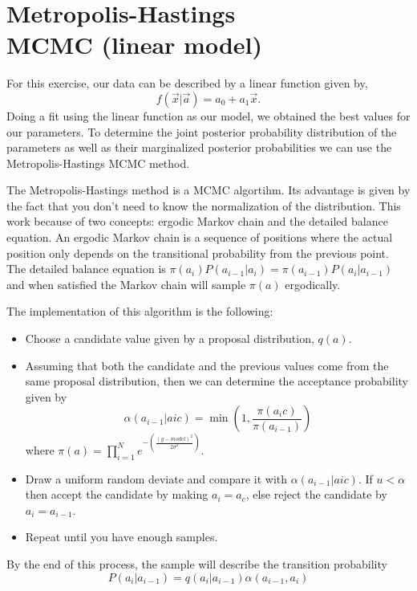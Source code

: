 \section{Metropolis-Hastings \\ MCMC (linear model)}

For this exercise, our data can be described by a linear function given by,
\begin{equation}
    f(\Vec{x}|\Vec{a})=a_0 + a_1\Vec{x}. 
    \label{eq:linearModel}
\end{equation}
Doing a fit using the linear function as our model, we obtained the best values for our parameters.
To determine the joint posterior probability distribution of the parameters as well as their marginalized posterior probabilities we can use the Metropolis-Hastings MCMC method.

The Metropolis-Hastings method is a MCMC algortihm. Its advantage is given by the fact that you don't need to know the normalization of the distribution. 
This work because of two concepts: ergodic Markov chain and the detailed balance equation. 
An ergodic Markov chain is a sequence of positions where the actual position only depends on the transitional probability from the previous point. 
The detailed balance equation is $\pi(a_i)P(a_{i-1}|a_{i})=\pi(a_{i-1})P(a_{i}|a_{i-1})$ and when satisfied the Markov chain will sample $\pi(a)$ ergodically. 

The implementation of this algorithm is the following:
\begin{itemize}
    \item Choose a candidate value given by a proposal distribution, $q(a)$. 
    \item Assuming that both the candidate and the previous values come from the same proposal distribution, then we can determine the acceptance probability given by 
    \begin{equation}
        \alpha(a_{i-1}|a{ic})=\min\left(1,\frac{\pi(a_ic)}{\pi(a_{i-1})}\right)
    \end{equation} where $\pi(a)=\prod^N_{i=1}e^{-\left(\frac{(y-model)^2}{2\sigma^2}\right)}$.
    \item Draw a uniform random deviate and compare it with $\alpha(a_{i-1}|a{ic})$. If $u<\alpha$ then accept the candidate by making $a_i=a_c$, else reject the candidate by $a_i=a_{i-1}$.
    \item Repeat until you have enough samples.
\end{itemize}

By the end of this process, the sample will describe the transition probability 
\begin{equation}
    P(a_{i}|a_{i-1})=q(a_{i}|a_{i-1})\alpha(a_{i-1},a_i)
\end{equation}

